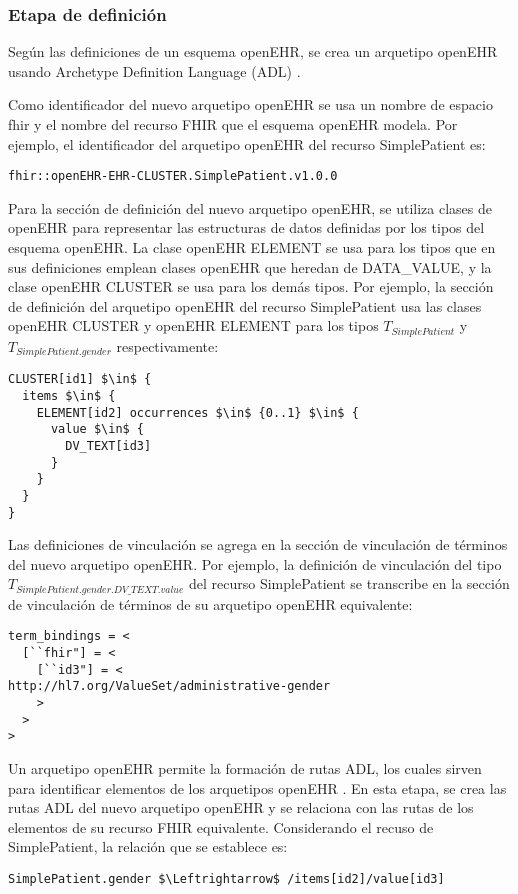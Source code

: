 \subsubsection{Etapa de definición}

Según las definiciones de un esquema openEHR, se crea un arquetipo openEHR usando Archetype Definition Language (ADL) \cite{openEHRADL}.

Como identificador del nuevo arquetipo openEHR se usa un nombre de espacio fhir y el nombre del recurso FHIR que el esquema openEHR modela. Por ejemplo, el identificador del arquetipo openEHR del recurso SimplePatient es:

\begin{lstlisting}
fhir::openEHR-EHR-CLUSTER.SimplePatient.v1.0.0
\end{lstlisting}

Para la sección de definición del nuevo arquetipo openEHR, se utiliza clases de openEHR para representar las estructuras de datos definidas por los tipos del esquema openEHR. La clase openEHR ELEMENT se usa para los tipos que en sus definiciones emplean clases openEHR que heredan de DATA\_VALUE, y la clase openEHR CLUSTER se usa para los demás tipos. Por ejemplo, la sección de definición del arquetipo openEHR del recurso SimplePatient usa las clases openEHR CLUSTER y openEHR ELEMENT para los tipos \(T_{SimplePatient}\) y \(T_{SimplePatient.gender}\) respectivamente:

\begin{lstlisting}[mathescape=true]
CLUSTER[id1] $\in$ {
  items $\in$ {
    ELEMENT[id2] occurrences $\in$ {0..1} $\in$ {
      value $\in$ {
        DV_TEXT[id3]
      }
    }
  }
}
\end{lstlisting}

Las definiciones de vinculación se agrega en la sección de vinculación de términos del nuevo arquetipo openEHR. Por ejemplo, la definición de vinculación del tipo \(T_{SimplePatient.gender.DV\_TEXT.value}\) del recurso SimplePatient se transcribe en la sección de vinculación de términos de su arquetipo openEHR equivalente:

\begin{lstlisting}
term_bindings = <
  [``fhir"] = <
    [``id3"] = <
http://hl7.org/ValueSet/administrative-gender
    >
  >
>
\end{lstlisting}

Un arquetipo openEHR permite la formación de rutas ADL, los cuales sirven para identificar elementos de los arquetipos openEHR \cite{openEHRArchitecture}. En esta etapa, se crea las rutas ADL del nuevo arquetipo openEHR y se relaciona con las rutas de los elementos de su recurso FHIR equivalente. Considerando el recuso de SimplePatient, la relación que se establece es:

\begin{lstlisting}[mathescape=true]
SimplePatient.gender $\Leftrightarrow$ /items[id2]/value[id3]
\end{lstlisting}

